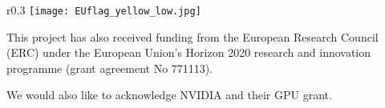 \documentclass{nle}
\begin{document}
 \begin{wrapfigure}{r}{0.3\hsize}
 \flushleft
   \vspace{-20pt} \hspace{10pt}
   \texttt{[image: EUflag\_yellow\_low.jpg]}
   \vspace{-10pt} \hspace{-10pt}
\end{wrapfigure}

This project has also received funding from the European Research Council (ERC) under the European Union’s Horizon 2020 research and innovation programme (grant agreement No 771113).

We would also like to acknowledge NVIDIA and their GPU grant.




\label{lastpage}
\end{document}
